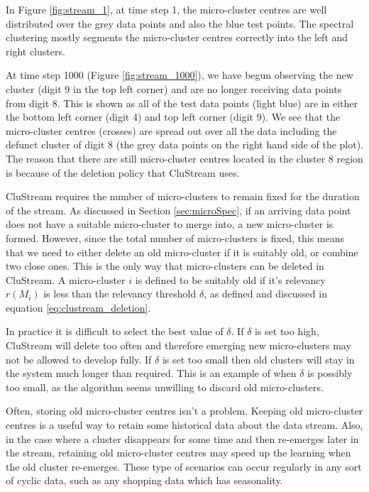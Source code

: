 In Figure \ref{fig:stream_1}, at time step 1, the micro-cluster centres are well distributed over the grey data points and also the blue test points. The spectral clustering mostly segments the micro-cluster centres correctly into the left and right clusters. 

At time step 1000 (Figure \ref{fig:stream_1000}), we have begun observing the new cluster (digit 9 in the top left corner) and are no longer receiving data points from digit 8. This is shown as all of the test data points (light blue) are in either the bottom left corner (digit 4) and top left corner (digit 9). We see that the micro-cluster centres (crosses) are spread out over all the data including the defunct cluster of digit 8 (the grey data points on the right hand side of the plot).  The reason that there are still micro-cluster centres located in the cluster 8 region is because of the deletion policy that CluStream uses.

CluStream requires the number of micro-clusters to remain fixed for the duration of the stream. As discussed in Section \ref{sec:microSpec}, if an arriving data point does not have a suitable micro-cluster to merge into, a new micro-cluster is formed. However, since the total number of micro-clusters is fixed, this means that we need to either delete an old micro-cluster if it is suitably old, or combine two close ones. This is the only way that micro-clusters can be deleted in CluStream.  A micro-cluster $i$ is defined to be suitably old if it's relevancy $r(M_i)$ is less than the relevancy threshold $\delta$, as defined and discussed in equation \eqref{eq:clustream_deletion}.

In practice it is difficult to select the best value of $\delta$. If $\delta$ is set too high, CluStream will delete too often and therefore emerging new micro-clusters may not be allowed to develop fully. If $\delta$ is set too small then old clusters will stay in the system much longer than required. This is an example of when $\delta$ is possibly too small, as the algorithm seems unwilling to discard old micro-clusters. %

Often, storing old micro-cluster centres  isn't a problem. Keeping old micro-cluster centres is a useful way to retain some historical data about the data stream. Also, in the case where a cluster disappears for some time and then re-emerges later in the stream, retaining old micro-cluster centres may speed up the learning when the old cluster re-emerges. These type of scenarios can occur regularly in any sort of cyclic data, such as any shopping data which has seasonality. 

